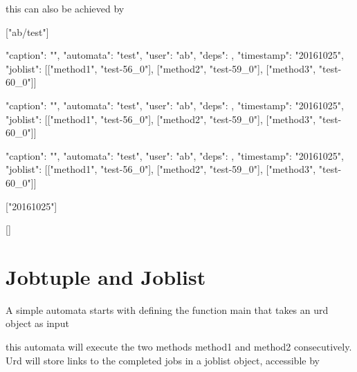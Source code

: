 this can also be achieved by

\begin{shell}
["ab/test"]

{"caption": "", "automata": "test", "user": "ab", "deps": {},
  "timestamp": "20161025", "joblist": [["method1", "test-56_0"],
  ["method2", "test-59_0"], ["method3", "test-60_0"]]}

{"caption": "", "automata": "test", "user": "ab", "deps": {},
  "timestamp": "20161025", "joblist": [["method1", "test-56_0"],
  ["method2", "test-59_0"], ["method3", "test-60_0"]]}

{"caption": "", "automata": "test", "user": "ab", "deps": {},
  "timestamp": "20161025", "joblist": [["method1", "test-56_0"],
  ["method2", "test-59_0"], ["method3", "test-60_0"]]}

["20161025"]

[]                                 

\end{shell}












\section{Jobtuple and Joblist}

A simple automata starts with defining the function main that takes an
urd object as input

this automata will execute the two methods method1 and method2
consecutively.  Urd will store links to the completed jobs in a
joblist object, accessible by




